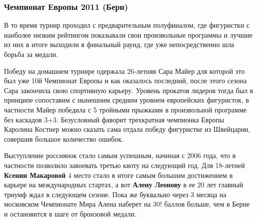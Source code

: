  
 
 
 
 

\subsubsection{Чемпионат Европы 2011 (Берн)}
\label{sec:04_01_2022.yz.figurka_ot_maksima_jagudina.1.chempionaty_evropy.1.bern_2011}

В то время турнир проходил с предварительным полуфиналом, где фигуристки с
наиболее низким рейтингом показывали свои произвольные программы и лучшие из
них в итоге выходили в финальный раунд, где уже непосредственно шла борьба за
медали.


Победу на домашнем турнире одержала 26-летняя Сара Майер для которой это был
уже 10й Чемпионат Европы и как оказалось последний, после этого сезона Сара
закончила свою спортивную карьеру. Уровень прокатов лидеров тогда был в
принципе сопоставим с нынешним средним уровнем европейских фигуристок, в
частности Майер победила с 5 тройными прыжками в произвольной программе без
каскадов 3+3. Безусловный фаворит трехкратная чемпионка Европы Каролина Костнер
можно сказать сама отдала победу фигуристке из Швейцарии, совершив большое
количество ошибок.

Выступление россиянок стало самым успешным, начиная с 2006 года, что в
частности позволило завоевать третью квоту на следующий год. Для 18-летней
\textbf{Ксении Макаровой} 4 место стало в итоге самым большим достижением в карьере на
международных стартах, а вот \textbf{Алену Леонову} в ее 20 лет главный триумф ждал в
следующем сезоне. Пока же буквально через 3 месяца на московском Чемпионате
Мира Алена наберет на 30! баллов больше, чем в Берне и остановится в шаге от
бронзовой медали.

